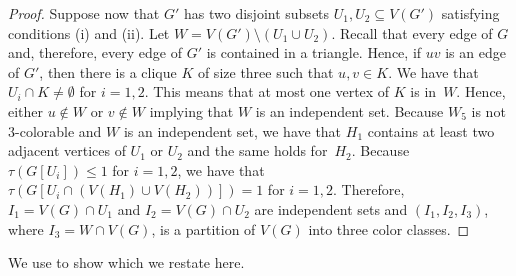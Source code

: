\documentclass[11pt]{article}
\theoremstyle{definition}
\begin{document}
\begin{proof}
Suppose now that $G'$ has two disjoint subsets $U_1,U_2\subseteq V(G')$ satisfying conditions (i) and (ii). Let $W=V(G')\setminus (U_1\cup U_2)$. Recall that every edge of $G$ and, therefore, every edge of $G'$ is contained in a triangle. Hence, if $uv$ is an edge of $G'$, then there is a clique $K$ of size three such that $u,v\in K$. We have that $U_i\cap K\neq\emptyset$ for $i=1,2$. This means that at most one vertex of $K$ is in~$W$. Hence, either $u\notin W$ or $v\notin W$ implying that
 $W$ is an independent set.  Because $W_5$ is not $3$-colorable and $W$ is an independent set, we have that $H_1$ contains at least two adjacent vertices of $U_1$ or $U_2$ and the same holds for~$H_2$. Because $\tau(G[U_i])\leq 1$ for $i=1,2$, we have that  $\tau(G[U_i\cap (V(H_1)\cup V(H_2))])=1$ for $i=1,2$. Therefore, $I_1=V(G)\cap U_1$ and $I_2=V(G)\cap U_2$ are independent sets and  $(I_1,I_2,I_3)$, where $I_3=W\cap V(G)$, is a partition of $V(G)$ into three color classes.
\end{proof}

We use  to show  which we restate here.

\npcmain*
\end{document}
